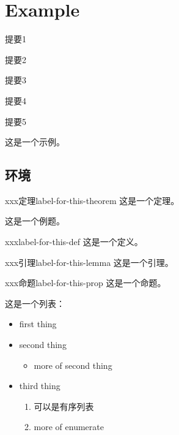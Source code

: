 \chapter{Example}

\begin{introduction}
\item 提要1
\item 提要2
\item 提要3
\item 提要4
\item 提要5
\end{introduction}

这是一个示例。

\section{环境}

\begin{theorem}{xxx定理}{label-for-this-theorem}
  这是一个定理。
\end{theorem}

\begin{example}
  这是一个例题。
\end{example}

\begin{definition}{xxx}{label-for-this-def}
  这是一个定义。
\end{definition}

\begin{lemma}{xxx引理}{label-for-this-lemma}
  这是一个引理。
\end{lemma}

\begin{proposition}{xxx命题}{label-for-this-prop}
  这是一个命题。
\end{proposition}

这是一个列表：

\begin{itemize}
  \item first thing
  \item second thing
    \begin{itemize}
      \item more of second thing
    \end{itemize}
  \item third thing
    \begin{enumerate}
      \item 可以是有序列表
      \item more of enumerate
    \end{enumerate}
\end{itemize}

